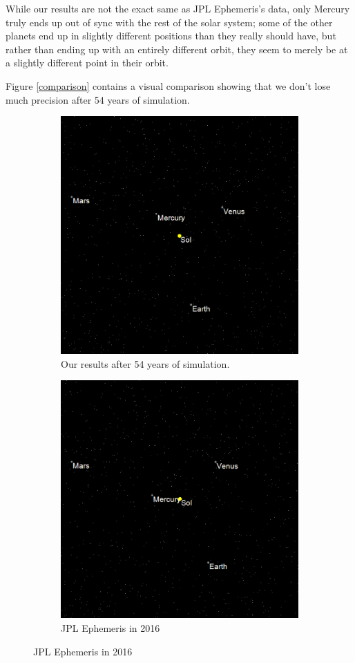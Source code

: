 \documentclass[a4paper]{article}
\begin{document}
While our results are not the exact same as JPL Ephemeris's data, only Mercury truly ends up out of sync with the rest of the solar system; some of the other planets end up in slightly different positions than they really should have, but rather than ending up with an entirely different orbit, they seem to merely be at a slightly different point in their orbit.

Figure \ref{comparison} contains a visual comparison showing that we don't lose much precision after 54 years of simulation.

\begin{figure}[!ht]
\centering

\begin{subfigure}{0.5\textwidth}
\centering
\includegraphics[width=0.8\linewidth]{comparison-our}
\caption{Our results after 54 years of simulation.}
\label{comparison:ours}
\end{subfigure}%
\begin{subfigure}{0.5\textwidth}
\centering
\includegraphics[width=0.8\linewidth]{comparison-jple}
\caption{JPL Ephemeris in 2016}
\label{comparison:jple}
\end{subfigure}


\end{figure}
\end{document}
